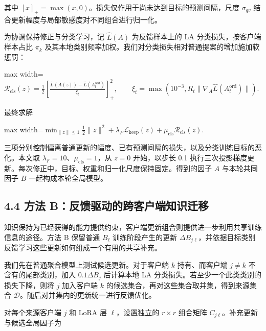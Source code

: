 \documentclass[UTF8,a4paper,10pt,fontset=fandol]{ctexart}
\begin{document}
其中 $[x]_+=\max(x,0)$。损失仅作用于尚未达到目标的预测间隔，尺度 $\sigma_{qv}$ 结合更新幅度与局部敏感度对不同组合进行归一化。


为协调保持修正与分类学习，记 $\widehat L(A)$ 为反馈样本上的 LA 分类损失，按客户端样本占比 $\pi_k$ 及其本地类别频率加权。我们对分类损失相对普通提案的增加施加软惩罚：


\begin{center}\begin{adjustbox}{max width=\linewidth}$\displaystyle \mathcal R_{\mathrm{cls}}(z)
=\frac12\left[
\frac{\widehat L(A(z))-\widehat L(A_t^{\mathrm{ord}})}{\xi_t}
\right]_+^2,
\qquad
\xi_t=\max\left(10^{-3},R_t\|\nabla_A\widehat L(A_t^{\mathrm{ord}})\|\right).$\end{adjustbox}\end{center}

最终求解


\begin{center}\begin{adjustbox}{max width=\linewidth}$\displaystyle \min_{\|z\|\leq1}
\frac12\|z\|^2
+\lambda_F\mathcal L_{\mathrm{keep}}(z)
+\mu_{\mathrm{cls}}\mathcal R_{\mathrm{cls}}(z).$\end{adjustbox}\end{center}

三项分别控制偏离普通更新的幅度、已有预测间隔的损失，以及分类训练目标的恶化。本文取 $\lambda_F=10$、$\mu_{\mathrm{cls}}=1$，从 $z=0$ 开始，以步长 0.1 执行三次投影梯度更新。每次修正中，目标、权重和归一化尺度保持固定。得到的因子 $A$ 与本轮共同因子 $B$ 一起构成本轮全局模型。


\subsection*{4.4 方法 B：反馈驱动的跨客户端知识迁移}

知识保持为已经获得的能力提供约束，客户端更新组合则提供进一步利用共享训练信息的途径。方法 B 保留普通 $B_\ell$ 训练阶段产生的更新 $\Delta B_{j\ell}$，并依据目标类别反馈学习这些更新如何组成一个有用的共享补充。


我们先在普通聚合模型上测试候选更新。对于客户端 $k$ 持有、而客户端 $j\ne k$ 不含有的尾部类别，加入 $0.1\Delta B_j$ 后计算本地 LA 分类损失。若至少一个此类类别的损失下降，则将 $j$ 加入客户端 $k$ 的候选集合，再对这些集合取并集，得到来源集合 $\mathcal D$。随后对并集内的更新统一进行反馈优化。


对每个来源客户端 $j$ 和 LoRA 层 $\ell$，设置独立的 $r\times r$ 组合矩阵 $C_{j\ell}$。补充更新与候选全局因子为
\end{document}
